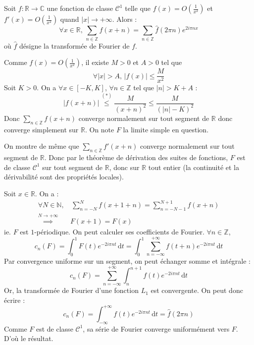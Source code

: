 





	\begin{theorem}
		\label{formule-sommatoire-de-poisson-1}
		Soit $f : \mathbb{R} \rightarrow \mathbb{C}$ une fonction de classe $\mathcal{C}^1$ telle que $f(x) = O \left( \frac{1}{x^2} \right)$ et $f'(x) = O \left( \frac{1}{x^2} \right)$ quand $|x| \longrightarrow +\infty$. Alors :
		\[ \forall x \in \mathbb{R}, \, \sum_{n \in \mathbb{Z}} f(x+n) = \sum_{n \in \mathbb{Z}} \widehat{f}(2 \pi n) e^{2 i \pi n x} \]
		où $\widehat{f}$ désigne la transformée de Fourier de $f$.
	\end{theorem}

	\begin{demonstration}
		Comme $f(x) = O \left( \frac{1}{x^2} \right)$, il existe $M > 0$ et $A > 0$ tel que
		\[ \forall |x| > A, \, |f(x)| \leq \frac{M}{x^2} \tag{$*$} \]
		Soit $K > 0$. On a $\forall x \in [-K, K]$, $\forall n \in \mathbb{Z}$ tel que $|n| > K + A$ :
		\[ |f(x+n)| \overset{(*)}{\leq} \frac{M}{(x+n)^2} \leq \frac{M}{(|n| - K)^2} \]
		Donc $\sum_{n \in \mathbb{Z}} f(x+n)$ converge normalement sur tout segment de $\mathbb{R}$ donc converge simplement sur $\mathbb{R}$. On note $F$ la limite simple en question.

		\medskip
		On montre de même que $\sum_{n \in \mathbb{Z}} f'(x+n)$ converge normalement sur tout segment de $\mathbb{R}$. Donc par le théorème de dérivation des suites de fonctions, $F$ est de classe $\mathcal{C}^1$ sur tout segment de $\mathbb{R}$, donc sur $\mathbb{R}$ tout entier (la continuité et la dérivabilité sont des propriétés locales).

		\medskip
		Soit $x \in \mathbb{R}$. On a :
		\begin{align*}
			\forall N \in \mathbb{N}, &\, \sum_{n=-N}^N f(x+1+n) = \sum_{n=-N-1}^{N+1} f(x+n) \\
			\overset{N \longrightarrow +\infty}{\implies} & F(x+1) = F(x)
		\end{align*}
		ie. $F$ est $1$-périodique. On peut calculer ses coefficients de Fourier. $\forall n \in \mathbb{Z}$,
		\[ c_n(F) = \int_0^1 F(t) e^{-2i\pi n t} \, \mathrm{d}t = \int_0^1 \sum_{n=-\infty}^{+\infty} f(t+n) e^{-2i\pi n t} \, \mathrm{d}t \]
		Par convergence uniforme sur un segment, on peut échanger somme et intégrale :
		\[ c_n(F) = \sum_{n=-\infty}^{+\infty} \int_n^{n+1} f(t) e^{-2i\pi n t} \, \mathrm{d}t \]
		Or, la transformée de Fourier d'une fonction $L_1$ est convergente. On peut donc écrire :
		\[ c_n(F) = \int_{-\infty}^{+\infty} f(t) e^{-2i\pi n t} \, \mathrm{d}t = \widehat{f}(2\pi n) \]
		Comme $F$ est de classe $\mathcal{C}^1$, sa série de Fourier converge uniformément vers $F$. D'où le résultat.
	\end{demonstration}

